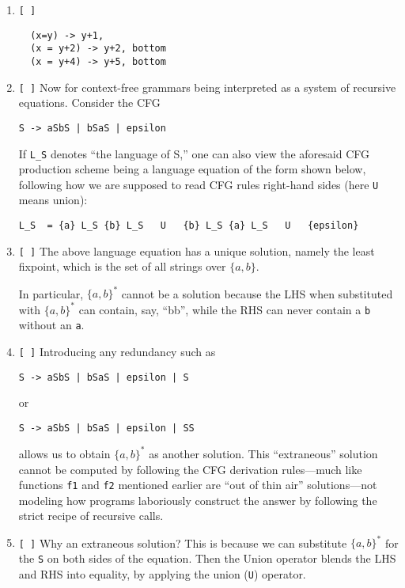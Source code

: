 \documentclass[11pt]{article}
\begin{document}
\begin{Large}
\begin{enumerate}
\item \verb|[ ]|
\begin{verbatim}  
  (x=y) -> y+1,
  (x = y+2) -> y+2, bottom 
  (x = y+4) -> y+5, bottom
\end{verbatim}


\item \verb|[ ]|
  Now for context-free grammars being interpreted as
  a system of recursive equations.
  Consider the CFG

\begin{verbatim}
S -> aSbS | bSaS | epsilon
\end{verbatim}

If \verb|L_S| denotes ``the language of S,'' one can also
view the aforesaid CFG production scheme being a language
equation of the form shown below, following how we are
supposed to read CFG rules right-hand sides (here \verb|U|
means union):

\begin{verbatim}
L_S  = {a} L_S {b} L_S   U   {b} L_S {a} L_S   U   {epsilon}
\end{verbatim}


\item \verb|[ ]| The above language equation has a unique
  solution, namely the least fixpoint, which is the
  set of all strings over $\{a,b\}$.

  In particular, $\{a,b\}^*$ cannot be a solution
  because the LHS when substituted with
  $\{a,b\}^*$ can contain, say, ``bb'', while
  the RHS can never contain a {\tt b} without an {\tt a}.

\item \verb|[ ]| Introducing any redundancy such as

  \begin{verbatim}
S -> aSbS | bSaS | epsilon | S
\end{verbatim}

  or

\begin{verbatim}
S -> aSbS | bSaS | epsilon | SS
\end{verbatim}  


allows us to obtain $\{a,b\}^*$ as another solution.
%
This ``extraneous'' solution cannot be computed by
following the CFG derivation rules---much like functions
{\tt f1} and {\tt f2} mentioned earlier are ``out of thin air''
solutions---not modeling how programs laboriously construct
the answer by following the strict recipe of recursive calls.

\item \verb|[ ]| Why an extraneous solution? 
  This is because we can substitute   $\{a,b\}^*$ for the {\tt S}
  on both sides of the equation. Then the Union operator
  blends the LHS and RHS into equality, by applying
  the union ({\tt U}) operator.


\end{enumerate}
\end{Large}
\end{document}
